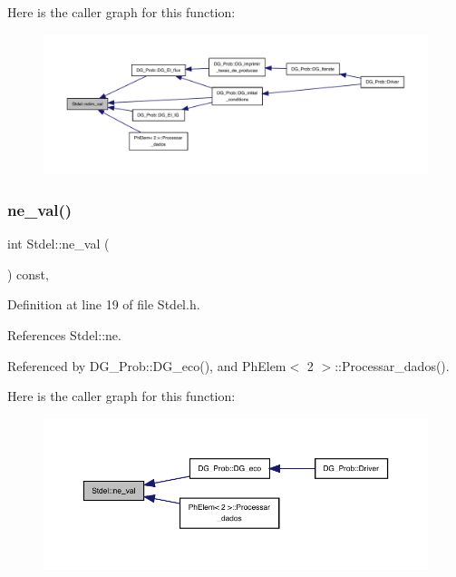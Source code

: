 Here is the caller graph for this function\+:
\nopagebreak
\begin{figure}[H]
\begin{center}
\leavevmode
\includegraphics[width=350pt]{classStdel_a383df930bee8dc298d7d412b3b632ebb_icgraph}
\end{center}
\end{figure}
\mbox{\label{classStdel_aa45f211663f5e8e47fdea32232ff23ea}} 
\subsubsection{\texorpdfstring{ne\+\_\+val()}{ne\_val()}}
{\footnotesize\ttfamily int Stdel\+::ne\+\_\+val (\begin{DoxyParamCaption}{ }\end{DoxyParamCaption}) const\hspace{0.3cm}{\ttfamily [inline]}, {\ttfamily [inherited]}}



Definition at line 19 of file Stdel.\+h.



References Stdel\+::ne.



Referenced by D\+G\+\_\+\+Prob\+::\+D\+G\+\_\+eco(), and Ph\+Elem$<$ 2 $>$\+::\+Processar\+\_\+dados().

Here is the caller graph for this function\+:
\nopagebreak
\begin{figure}[H]
\begin{center}
\leavevmode
\includegraphics[width=350pt]{classStdel_aa45f211663f5e8e47fdea32232ff23ea_icgraph}
\end{center}
\end{figure}
\mbox{\label{classStdel_a2eed3ce0b73050e868989be78d918e5c}} 
